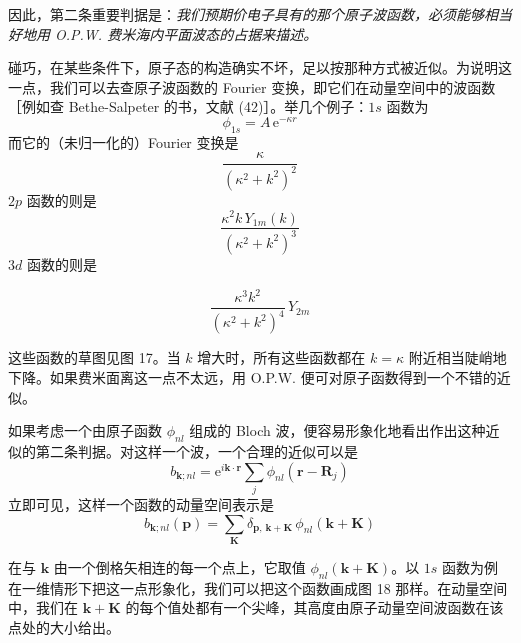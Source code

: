 因此，第二条重要判据是：\emph{我们预期价电子具有的那个原子波函数，必须能够相当好地用 O.P.W. 费米海内平面波态的占据来描述。}

碰巧，在某些条件下，原子态的构造确实不坏，足以按那种方式被近似。为说明这一点，我们可以去查原子波函数的 Fourier 变换，即它们在动量空间中的波函数［例如查 Bethe-Salpeter 的书，文献 (42)］。举几个例子：$1s$ 函数为
\begin{equation*}
\phi_{1s} = A\,\mathrm{e}^{-\kappa r}
\end{equation*}
而它的（未归一化的）Fourier 变换是
\begin{equation*}
\frac{\kappa}{\left(\kappa^2 + k^2\right)^2}
\end{equation*}
$2p$ 函数的则是
\begin{equation*}
\frac{\kappa^2 k\,Y_{1m}(k)}{\left(\kappa^2 + k^2\right)^3}
\end{equation*}
$3d$ 函数的则是

\begin{equation*}
\frac{\kappa^3 k^2}{\left(\kappa^2 + k^2\right)^4}\,Y_{2m}
\end{equation*}

这些函数的草图见图 17。当 $k$ 增大时，所有这些函数都在 $k = \kappa$ 附近相当陡峭地下降。如果费米面离这一点不太远，用 O.P.W. 便可对原子函数得到一个不错的近似。


如果考虑一个由原子函数 $\phi_{nl}$ 组成的 Bloch 波，便容易形象化地看出作出这种近似的第二条判据。对这样一个波，一个合理的近似可以是
\begin{equation*}
b_{\mathbf{k};nl} = \mathrm{e}^{i\mathbf{k}\cdot\mathbf{r}}\sum_j \phi_{nl}(\mathbf{r} - \mathbf{R}_j)
\end{equation*}
立即可见，这样一个函数的动量空间表示是
\begin{equation*}
b_{\mathbf{k};nl}(\mathbf{p}) = \sum_{\mathbf{K}} \delta_{\mathbf{p},\,\mathbf{k}+\mathbf{K}}\,\phi_{nl}(\mathbf{k} + \mathbf{K})
\end{equation*}

在与 $\mathbf{k}$ 由一个倒格矢相连的每一个点上，它取值 $\phi_{nl}(\mathbf{k} + \mathbf{K})$。以 $1s$ 函数为例在一维情形下把这一点形象化，我们可以把这个函数画成图 18 那样。在动量空间中，我们在 $\mathbf{k} + \mathbf{K}$ 的每个值处都有一个尖峰，其高度由原子动量空间波函数在该点处的大小给出。

